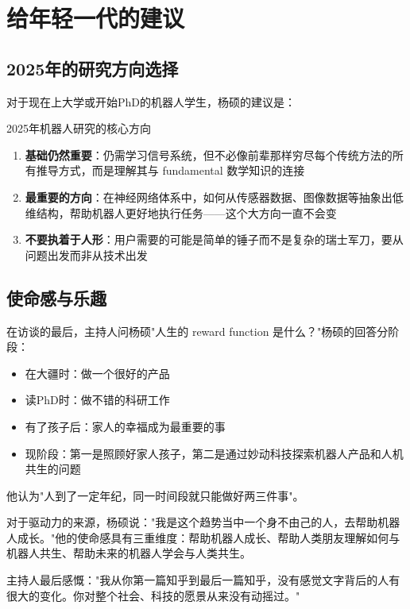 \section{给年轻一代的建议}

\subsection{2025年的研究方向选择}

对于现在上大学或开始PhD的机器人学生，杨硕的建议是：

\begin{knowledgebox}{2025年机器人研究的核心方向}
\begin{enumerate}
    \item \textbf{基础仍然重要}：仍需学习信号系统，但不必像前辈那样穷尽每个传统方法的所有推导方式，而是理解其与 fundamental 数学知识的连接
    \item \textbf{最重要的方向}：在神经网络体系中，如何从传感器数据、图像数据等抽象出低维结构，帮助机器人更好地执行任务——这个大方向一直不会变
    \item \textbf{不要执着于人形}：用户需要的可能是简单的锤子而不是复杂的瑞士军刀，要从问题出发而非从技术出发
\end{enumerate}
\end{knowledgebox}

\subsection{使命感与乐趣}

在访谈的最后，主持人问杨硕"人生的 reward function 是什么？"杨硕的回答分阶段：
\begin{itemize}
    \item 在大疆时：做一个很好的产品
    \item 读PhD时：做不错的科研工作
    \item 有了孩子后：家人的幸福成为最重要的事
    \item 现阶段：第一是照顾好家人孩子，第二是通过妙动科技探索机器人产品和人机共生的问题
\end{itemize}

他认为"人到了一定年纪，同一时间段就只能做好两三件事"。

对于驱动力的来源，杨硕说："我是这个趋势当中一个身不由己的人，去帮助机器人成长。"他的使命感具有三重维度：帮助机器人成长、帮助人类朋友理解如何与机器人共生、帮助未来的机器人学会与人类共生。

主持人最后感慨："我从你第一篇知乎到最后一篇知乎，没有感觉文字背后的人有很大的变化。你对整个社会、科技的愿景从来没有动摇过。"

